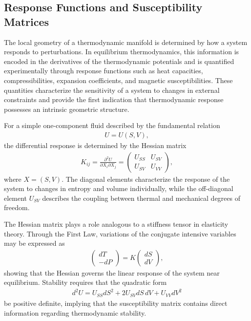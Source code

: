 \subsection{Response Functions and Susceptibility Matrices}


The local geometry of a thermodynamic manifold is determined by how a system responds to perturbations. In equilibrium thermodynamics, this information is encoded in the derivatives of the thermodynamic potentials and is quantified experimentally through response functions such as heat capacities, compressibilities, expansion coefficients, and magnetic susceptibilities. These quantities characterize the sensitivity of a system to changes in external constraints and provide the first indication that thermodynamic response possesses an intrinsic geometric structure.

For a simple one-component fluid described by the fundamental relation
\begin{align}
U=U(S,V),
\end{align}
the differential response is determined by the Hessian matrix
\begin{align}
K_{ij}
=
\frac{\partial^2 U}
{\partial X_i \partial X_j}
=
\begin{pmatrix}
U_{SS} & U_{SV}\\
U_{SV} & U_{VV}
\end{pmatrix},
\end{align}
where $X=(S,V)$. The diagonal elements characterize the response of the system to changes in entropy and volume individually, while the off-diagonal element \(U_{SV}\) describes the coupling between thermal and mechanical degrees of freedom.

The Hessian matrix plays a role analogous to a stiffness tensor in elasticity theory. Through the First Law, variations of the conjugate intensive variables may be expressed as
\begin{align}
\begin{pmatrix}
dT\\
-dP
\end{pmatrix}
=
K
\begin{pmatrix}
dS \\  dV
\end{pmatrix},
\end{align}
showing that the Hessian governs the linear response of the system near equilibrium. Stability requires that the quadratic form
\begin{align}
d^2U
=
U_{SS}dS^2
+
2U_{SV}dS\,dV
+
U_{VV}dV^2
\end{align}
be positive definite, implying that the susceptibility matrix contains direct information regarding thermodynamic stability.

